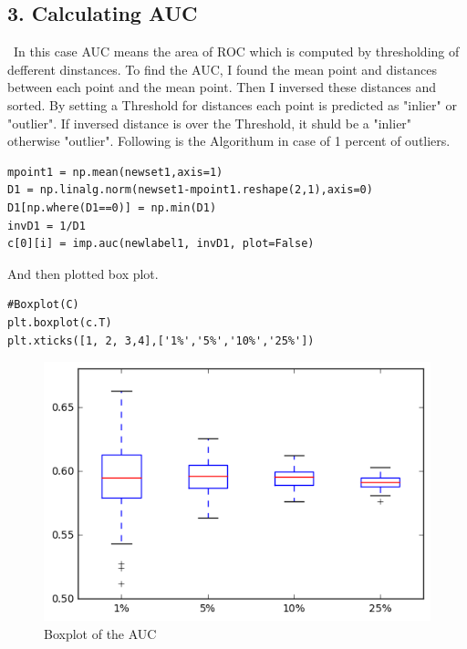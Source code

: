 \documentclass[a4paper,11pt]{article}
\begin{document}
\subsection*{3. Calculating AUC}
\ In this case AUC means the area of ROC which is computed by thresholding of defferent dinstances. To find the AUC, I found the mean point and distances between each point and the mean point. Then I inversed these distances and sorted. By setting a Threshold for distances each point is predicted as "inlier" or "outlier". If inversed distance is over the Threshold, it shuld be a "inlier" otherwise "outlier". Following is the Algorithum in case of 1 percent of outliers.

\begin{verbatim}
mpoint1 = np.mean(newset1,axis=1)
D1 = np.linalg.norm(newset1-mpoint1.reshape(2,1),axis=0)
D1[np.where(D1==0)] = np.min(D1)
invD1 = 1/D1
c[0][i] = imp.auc(newlabel1, invD1, plot=False)
\end{verbatim}

And then plotted box plot.

\begin{verbatim}
#Boxplot(C)
plt.boxplot(c.T)
plt.xticks([1, 2, 3,4],['1%','5%','10%','25%'])
\end{verbatim}

\begin{figure}[htbp]
  \includegraphics[scale=0.5]{auc.png}
  \caption{Boxplot of the AUC}
\end{figure}

\begin{verbatim}






\end{verbatim}
\end{document}
